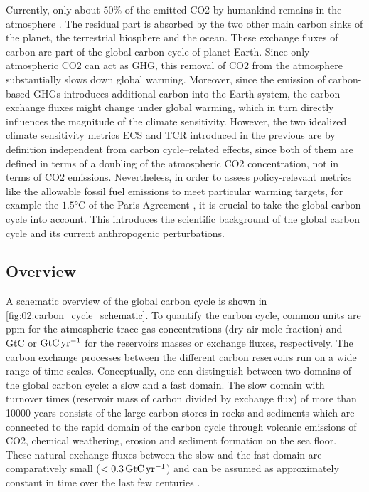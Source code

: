Currently, only about $50 \unit{\%}$ of the emitted \ac{CO2} by humankind
remains in the atmosphere \autocite{Friedlingstein2020}. The residual part is
absorbed by the two other main carbon sinks of the planet, the terrestrial
biosphere and the ocean. These exchange fluxes of carbon are part of the global
carbon cycle of planet Earth. Since only atmospheric \ac{CO2} can act as
\ac{GHG}, this removal of \ac{CO2} from the atmosphere substantially slows down
global warming. Moreover, since the emission of carbon-based \acp{GHG}
introduces additional carbon into the Earth system, the carbon exchange fluxes
might change under global warming, which in turn directly influences the
magnitude of the climate sensitivity. However, the two idealized climate
sensitivity metrics \ac{ECS} and \ac{TCR} introduced in the previous
 are by definition independent from carbon
cycle--related effects, since both of them are defined in terms of a doubling
of the atmospheric \ac{CO2} concentration, not in terms of \ac{CO2} emissions.
Nevertheless, in order to assess policy-relevant metrics like the allowable
fossil fuel emissions to meet particular warming targets, for example the $1.5
\unit{\degreeCelsius}$ of the Paris Agreement \autocite{UNFCCC2015}, it is
crucial to take the global carbon cycle into account. This
 introduces the scientific background of the
global carbon cycle and its current anthropogenic perturbations.


\subsection{Overview}
\label{subsec:02:carbon_cycle_overview}

A schematic overview of the global carbon cycle is shown in
\cref{fig:02:carbon_cycle_schematic}. To quantify the carbon cycle, common
units are \ac{ppm} for the atmospheric trace gas concentrations (dry-air mole
fraction) and \ac{GtC} or $\si{\GtCyr{}}$ for the reservoirs masses or exchange
fluxes, respectively. The carbon exchange processes between the different
carbon reservoirs run on a wide range of time scales. Conceptually, one can
distinguish between two domains of the global carbon cycle: a slow and a fast
domain. The slow domain with turnover times (reservoir mass of carbon divided
by exchange flux) of more than 10000 years consists of the large carbon stores
in rocks and sediments which are connected to the rapid domain of the carbon
cycle through volcanic emissions of \ac{CO2}, chemical weathering, erosion and
sediment formation on the sea floor. These natural exchange fluxes between the
slow and the fast domain are comparatively small ($< 0.3 \unit{\GtCyr{}}$) and
can be assumed as approximately constant in time over the last few centuries
\autocite{Ciais2013}.

